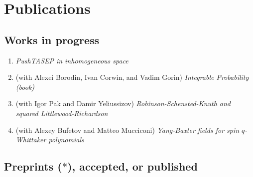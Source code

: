 \documentclass[letterpaper,11pt]{article}
\begin{document}
\section*{Publications}

\subsection*{Works in progress}

\begin{enumerate}
	\item \emph{PushTASEP in inhomogeneous space}
	\item (with Alexei Borodin, Ivan Corwin, and Vadim Gorin)
		\emph{Integrable Probability (book)}
	\item (with Igor Pak and Damir Yeliussizov)
		\emph{Robinson-Schensted-Knuth and 
		squared Little\-wood-Richardson}
	\item (with Alexey Bufetov and Matteo Mucciconi)
		\emph{Yang-Baxter fields for 
		spin $q$-Whittaker polynomials}
\end{enumerate}


\subsection*{Preprints ($*$), accepted, or published}
\end{document}
